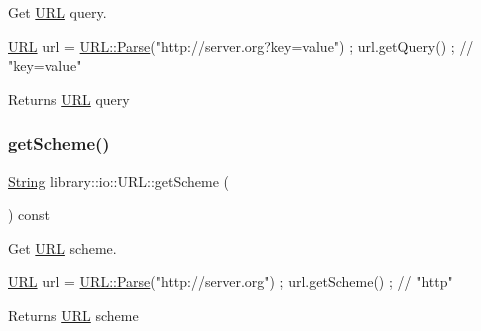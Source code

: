 Get \hyperlink{classlibrary_1_1io_1_1_u_r_l}{U\+RL} query. 


\begin{DoxyCode}
\hyperlink{classlibrary_1_1io_1_1_u_r_l_a7e9c070138a6dbd000ffb10b7cd8a5c4}{URL} url = \hyperlink{classlibrary_1_1io_1_1_u_r_l_a03a589af0787df20428d4d33e26bb2d7}{URL::Parse}(\textcolor{stringliteral}{"http://server.org?key=value"}) ;
url.getQuery() ; \textcolor{comment}{// "key=value"}
\end{DoxyCode}


\begin{DoxyReturn}{Returns}
\hyperlink{classlibrary_1_1io_1_1_u_r_l}{U\+RL} query 
\end{DoxyReturn}
\mbox{\label{classlibrary_1_1io_1_1_u_r_l_ab36d8bd486f69fc44cfd5aa4e337e3b2}} 
\subsubsection{\texorpdfstring{get\+Scheme()}{getScheme()}}
{\footnotesize\ttfamily \hyperlink{namespacelibrary_1_1io_a7469b45835a4421045db344d6a5a1f85}{String} library\+::io\+::\+U\+R\+L\+::get\+Scheme (\begin{DoxyParamCaption}{ }\end{DoxyParamCaption}) const}



Get \hyperlink{classlibrary_1_1io_1_1_u_r_l}{U\+RL} scheme. 


\begin{DoxyCode}
\hyperlink{classlibrary_1_1io_1_1_u_r_l_a7e9c070138a6dbd000ffb10b7cd8a5c4}{URL} url = \hyperlink{classlibrary_1_1io_1_1_u_r_l_a03a589af0787df20428d4d33e26bb2d7}{URL::Parse}(\textcolor{stringliteral}{"http://server.org"}) ;
url.getScheme() ; \textcolor{comment}{// "http"}
\end{DoxyCode}


\begin{DoxyReturn}{Returns}
\hyperlink{classlibrary_1_1io_1_1_u_r_l}{U\+RL} scheme 
\end{DoxyReturn}
\mbox{\label{classlibrary_1_1io_1_1_u_r_l_a1671af07f30ce9ce7a316437c5a731f7}} 
